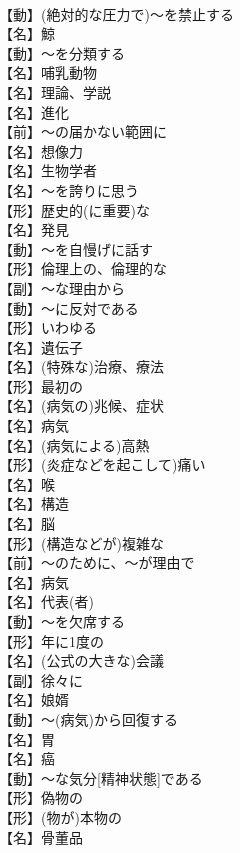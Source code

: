 \documentclass[8pt]{extreport}
\begin{document}
\begin{CJK}{UTF8}{min}
\\	【動】(絶対的な圧力で)～を禁止する
\\	【名】鯨
\\	【動】～を分類する
\\	【名】哺乳動物
\\	【名】理論、学説
\\	【名】進化
\\	【前】～の届かない範囲に
\\	【名】想像力
\\	【名】生物学者
\\	【名】～を誇りに思う
\\	【形】歴史的(に重要)な
\\	【名】発見
\\	【動】～を自慢げに話す
\\	【形】倫理上の、倫理的な
\\	【副】～な理由から
\\	【動】～に反対である
\\	【形】いわゆる
\\	【名】遺伝子
\\	【名】(特殊な)治療、療法
\\	【形】最初の
\\	【名】(病気の)兆候、症状
\\	【名】病気
\\	【名】(病気による)高熱
\\	【形】(炎症などを起こして)痛い
\\	【名】喉
\\	【名】構造
\\	【名】脳
\\	【形】(構造などが)複雑な
\\	【前】～のために、～が理由で
\\	【名】病気
\\	【名】代表(者)
\\	【動】～を欠席する
\\	【形】年に1度の
\\	【名】(公式の大きな)会議
\\	【副】徐々に
\\	【名】娘婿
\\	【動】～(病気)から回復する
\\	【名】胃
\\	【名】癌
\\	【動】～な気分[精神状態]である
\\	【形】偽物の
\\	【形】(物が)本物の
\\	【名】骨董品

\end{CJK}
\end{document}
